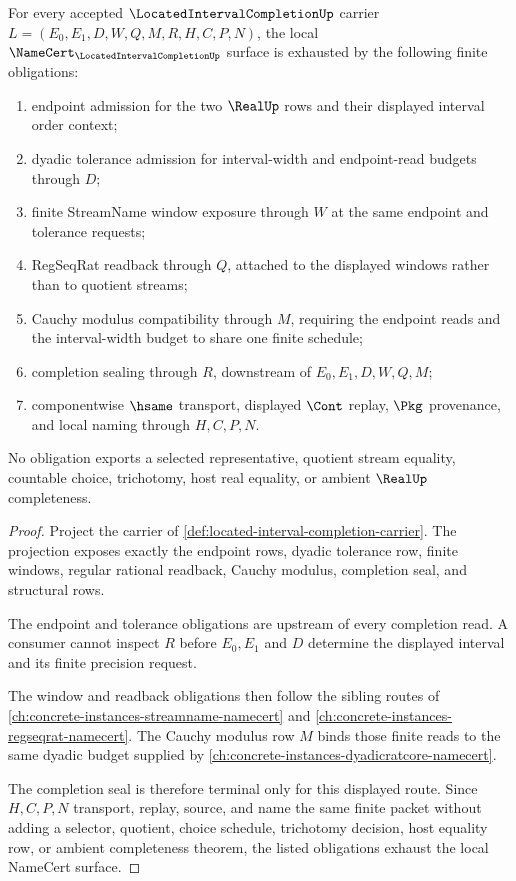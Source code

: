 \begin{theorem}
\label{thm:located-interval-completion-namecert-obligations}
For every accepted $\LocatedIntervalCompletionUp$ carrier $L=(E_0,E_1,D,W,Q,M,R,H,C,P,N)$, the local $\NameCert_{\LocatedIntervalCompletionUp}$ surface is exhausted by the following finite obligations:
\begin{enumerate}
\item endpoint admission for the two $\RealUp$ rows and their displayed interval order context;
\item dyadic tolerance admission for interval-width and endpoint-read budgets through $D$;
\item finite StreamName window exposure through $W$ at the same endpoint and tolerance requests;
\item RegSeqRat readback through $Q$, attached to the displayed windows rather than to quotient streams;
\item Cauchy modulus compatibility through $M$, requiring the endpoint reads and the interval-width budget to share one finite schedule;
\item completion sealing through $R$, downstream of $E_0,E_1,D,W,Q,M$;
\item componentwise $\hsame$ transport, displayed $\Cont$ replay, $\Pkg$ provenance, and local naming through $H,C,P,N$.
\end{enumerate}
No obligation exports a selected representative, quotient stream equality, countable choice, trichotomy, host real equality, or ambient $\RealUp$ completeness.
\end{theorem}
\begin{proof}
Project the carrier of \autoref{def:located-interval-completion-carrier}. The projection exposes exactly the endpoint rows, dyadic tolerance row, finite windows, regular rational readback, Cauchy modulus, completion seal, and structural rows.

The endpoint and tolerance obligations are upstream of every completion read. A consumer cannot inspect $R$ before $E_0,E_1$ and $D$ determine the displayed interval and its finite precision request.

The window and readback obligations then follow the sibling routes of \autoref{ch:concrete-instances-streamname-namecert} and \autoref{ch:concrete-instances-regseqrat-namecert}. The Cauchy modulus row $M$ binds those finite reads to the same dyadic budget supplied by \autoref{ch:concrete-instances-dyadicratcore-namecert}.

The completion seal is therefore terminal only for this displayed route. Since $H,C,P,N$ transport, replay, source, and name the same finite packet without adding a selector, quotient, choice schedule, trichotomy decision, host equality row, or ambient completeness theorem, the listed obligations exhaust the local NameCert surface.
\end{proof}

